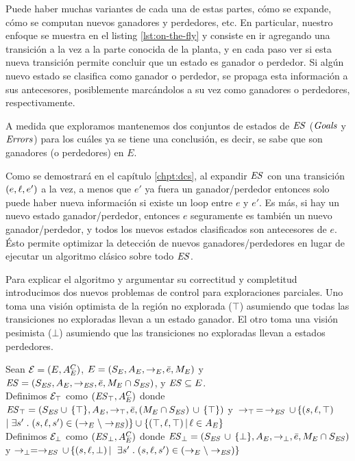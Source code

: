 Puede haber muchas variantes de cada una de estas partes, cómo se expande, cómo se computan nuevos ganadores y perdedores, etc. En particular, nuestro enfoque se muestra en el listing \ref{lst:on-the-fly} y consiste en ir agregando una transición a la vez a la parte conocida de la planta, y en cada paso ver si esta nueva transición permite concluir que un estado es ganador o perdedor. Si algún nuevo estado se clasifica como ganador  o perdedor, se propaga esta información a sus antecesores, posiblemente marcándolos a su vez como ganadores o perdedores, respectivamente.

A medida que exploramos mantenemos dos conjuntos de estados de $\mathit{ES}$ ($\mathit{Goals}$ y $\mathit{Errors}$) para los cuáles ya se tiene una conclusión, es decir, se sabe que son ganadores (o perdedores) en $E$.

Como se demostrará en el capítulo \ref{chpt:dcs}, al expandir $\mathit{ES}$ con una transición $(e,\ell,e')$ a la vez, a menos que $e'$ ya fuera un ganador/perdedor entonces solo puede haber nueva información si existe un loop entre $e$ y $e'$. Es más, si hay un nuevo estado ganador/perdedor, entonces $e$ seguramente es también un nuevo ganador/perdedor, y todos los nuevos estados clasificados son antecesores de $e$. Ésto permite optimizar la detección de nuevos ganadores/perdedores en lugar de ejecutar un algoritmo clásico sobre todo $\mathit{ES}$.




Para explicar el algoritmo y argumentar su correctitud y completitud introducimos dos nuevos problemas de control para exploraciones parciales. Uno toma una visión optimista de la región no explorada ($\top$) asumiendo que todas las transiciones no exploradas llevan a un estado ganador. El otro toma una visión pesimista ($\bot$) asumiendo que las transiciones no exploradas llevan a estados perdedores.

\begin{definition}
	 \label{def:unexploredTo}
	
	Sean $\mathcal{E} = (E, A_E^C)$, $E = (S_E,A_E,\rightarrow_E,\bar{e},M_E)$ y $\mathit{ES} = 
	(S_{\mathit{ES}},A_E, \rightarrow_{\mathit{ES}},\bar{e},M_E \cap S_{\mathit{ES}})$, y $\mathit{ES} 
	\subseteq E$.
	\\
	Definimos $\mathcal{E}_\top$ como $(\mathit{{\mathit{ES}}_{\top}}, A_E^C)$ donde 
	$\mathit{{\mathit{ES}}_{\top}} = (S_{\mathit{ES}} \cup \, \{\top\},A_E,\rightarrow_\top, 
	\bar{e}, 
	(M_E \cap S_{\mathit{ES}})\, \cup \, \{\top\})$ y $\, \rightarrow_\top \, = \, \rightarrow_{\mathit{ES}} 
	\, 
	\cup\, \{(s,\ell, \top) 
	\;$ $ | \; \exists s' \;.\; (s, \ell, s') \in (\rightarrow_E \setminus \rightarrow_{\mathit{ES}})\} \cup \{(\top, \ell, \top) \, | \, \ell \in A_E\}$ \\
	Definimos $\mathcal{E}_\bot$ como $(\mathit{{\mathit{ES}}_{\bot}}, A_E^C)$ donde 
	$\mathit{{\mathit{ES}}_{\bot}} = (S_{\mathit{ES}} \, \cup \, 
	\{\bot\},A_E,\rightarrow_\bot, 
	\bar{e}, M_E \cap S_{\mathit{ES}})$ y $\rightarrow_\bot = \rightarrow_{\mathit{ES}} \, \cup \, \{(s,\ell, 
	\bot) \, | \, $ $ \exists s' \;.\; (s, \ell, s') \in (\rightarrow_E \setminus \rightarrow_{\mathit{ES}})\}$ 
\end{definition}

